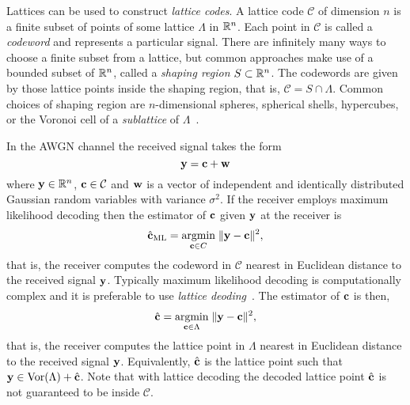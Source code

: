 \documentclass[journal]{IEEEtran}
\begin{document}
\newcommand{\calX}{\mathcal X}
\newcommand{\calC}{\mathcal C}
Lattices can be used to construct \emph{lattice codes}.  A lattice code $\calC$ of dimension $n$ is a finite subset of points of some lattice $\Lambda$ in ${\mathbb R}^n$.  Each point in $\calC$ is called a \emph{codeword} and represents a particular signal.  There are infinitely many ways to choose a finite subset from a lattice, but common approaches make use of a bounded subset of ${\mathbb R}^n$, called a \emph{shaping region} $S \subset {\mathbb R}^n$.  The codewords are given by those lattice points inside the shaping region, that is, $\calC = S \cap \Lambda.$  Common choices of shaping region are $n$-dimensional spheres, spherical shells, hypercubes, or the Voronoi cell of a \emph{sublattice} of $\Lambda$~\cite{Buda1989_some_opt_codes_structure,Erex2004_lattice_decoding,Conway1983VoronoiCodes}.  

In the AWGN channel the received signal takes the form
\[
\mathbf{y} = \mathbf{c} + \mathbf{w}
\]
where $\mathbf{y} \in {\mathbb R}^n$, $\cbf \in \calC$ and $\mathbf{w}$ is a vector of independent and identically distributed Gaussian random variables with variance $\sigma^2$.  If the receiver employs maximum likelihood decoding then the estimator of $\mathbf{c}$ given $\mathbf{y}$ at the receiver is
\begin{equation}\label{eq:mldecoder}
\hat{\cbf}_{\text{ML}} = \underset{\cbf \in C}{\operatorname{argmin}}\;\| \ybf - \cbf \|^2,
\end{equation}
that is, the receiver computes the codeword in $\calC$ nearest in Euclidean distance to the received signal $\mathbf{y}$.  Typically maximum likelihood decoding is computationally complex and it is preferable to use \emph{lattice deoding}~\cite{Erex2004_lattice_decoding}.  The estimator of $\mathbf{c}$ is then,
\begin{equation}\label{eq:latticedecoder}
\hat{\cbf} = \underset{\cbf \in \Lambda}{\operatorname{argmin}}\;\| \ybf - \cbf \|^2,
\end{equation}
that is, the receiver computes the lattice point in $\Lambda$ nearest in Euclidean distance to the received signal $\mathbf{y}$.  Equivalently, $\hat{\mathbf{c}}$ is the lattice point such that $\mathbf{y} \in \operatorname{Vor}(\Lambda) + \hat{\mathbf{c}}$.  Note that with lattice decoding the decoded lattice point $\hat{\mathbf{c}}$ is not guaranteed to be inside $\calC$.
\end{document}
